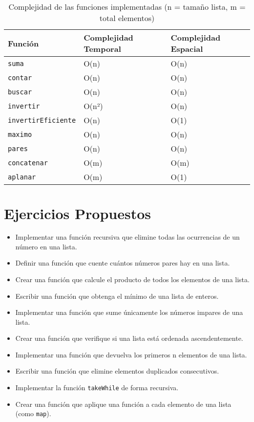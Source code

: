 \documentclass[12pt]{article}
\begin{document}
\begin{table}[h]
\centering
\begin{tabular}{@{}lll@{}}
\toprule
\textbf{Función} & \textbf{Complejidad Temporal} & \textbf{Complejidad Espacial} \\
\midrule
\texttt{suma} & O(n) & O(n) \\
\texttt{contar} & O(n) & O(n) \\
\texttt{buscar} & O(n) & O(n) \\
\texttt{invertir} & O(n²) & O(n) \\
\texttt{invertirEficiente} & O(n) & O(1) \\
\texttt{maximo} & O(n) & O(n) \\
\texttt{pares} & O(n) & O(n) \\
\texttt{concatenar} & O(m) & O(m) \\
\texttt{aplanar} & O(m) & O(1) \\
\bottomrule
\end{tabular}
\caption{Complejidad de las funciones implementadas (n = tamaño lista, m = total elementos)}
\end{table}

\section*{Ejercicios Propuestos}
\begin{itemize}
  \item Implementar una función recursiva que elimine todas las ocurrencias de un número en una lista.
  \item Definir una función que cuente cuántos números pares hay en una lista.
  \item Crear una función que calcule el producto de todos los elementos de una lista.
  \item Escribir una función que obtenga el mínimo de una lista de enteros.
  \item Implementar una función que sume únicamente los números impares de una lista.
  \item Crear una función que verifique si una lista está ordenada ascendentemente.
  \item Implementar una función que devuelva los primeros n elementos de una lista.
  \item Escribir una función que elimine elementos duplicados consecutivos.
  \item Implementar la función \texttt{takeWhile} de forma recursiva.
  \item Crear una función que aplique una función a cada elemento de una lista (como \texttt{map}).
\end{itemize}
\end{document}
